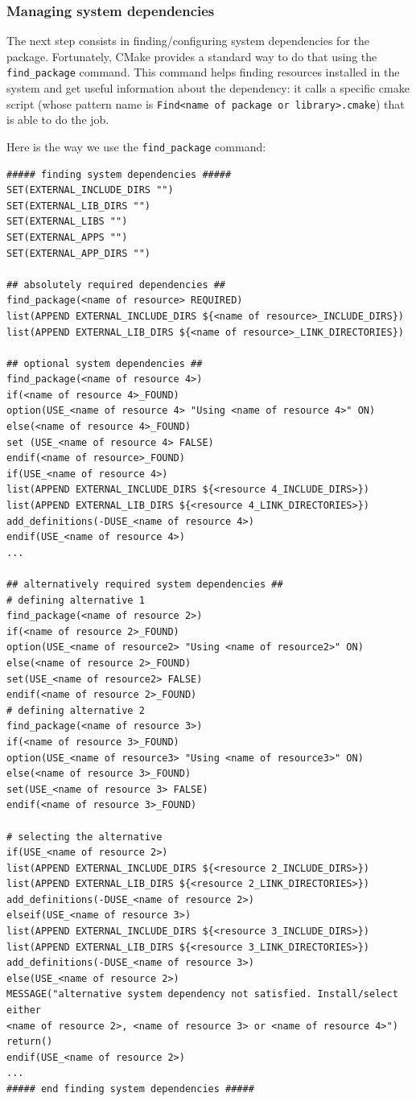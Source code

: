 \documentclass[12pt,a4paper]{article}
\begin{document}
\subsubsection{Managing system dependencies}

The next step consists in finding/configuring system dependencies for the package. Fortunately, CMake provides a standard way to do that using the \verb|find_package| command. This command helps finding resources installed in the system and get useful information about the dependency: it calls a specific cmake script (whose pattern name is \texttt{Find<name of package or library>.cmake}) that is able to do the job.

Here is the way we use the \verb|find_package| command:

\begin{verbatim}
##### finding system dependencies #####
SET(EXTERNAL_INCLUDE_DIRS "")
SET(EXTERNAL_LIB_DIRS "")
SET(EXTERNAL_LIBS "")
SET(EXTERNAL_APPS "")
SET(EXTERNAL_APP_DIRS "")

## absolutely required dependencies ##
find_package(<name of resource> REQUIRED)
list(APPEND EXTERNAL_INCLUDE_DIRS ${<name of resource>_INCLUDE_DIRS})
list(APPEND EXTERNAL_LIB_DIRS ${<name of resource>_LINK_DIRECTORIES})

## optional system dependencies ##
find_package(<name of resource 4>)
if(<name of resource 4>_FOUND)
option(USE_<name of resource 4> "Using <name of resource 4>" ON)
else(<name of resource 4>_FOUND)
set (USE_<name of resource 4> FALSE)
endif(<name of resource>_FOUND)
if(USE_<name of resource 4>)
list(APPEND EXTERNAL_INCLUDE_DIRS ${<resource 4_INCLUDE_DIRS>})
list(APPEND EXTERNAL_LIB_DIRS ${<resource 4_LINK_DIRECTORIES>})
add_definitions(-DUSE_<name of resource 4>)
endif(USE_<name of resource 4>)
...

## alternatively required system dependencies ##
# defining alternative 1
find_package(<name of resource 2>)
if(<name of resource 2>_FOUND)
option(USE_<name of resource2> "Using <name of resource2>" ON)
else(<name of resource 2>_FOUND)
set(USE_<name of resource2> FALSE)
endif(<name of resource 2>_FOUND)
# defining alternative 2
find_package(<name of resource 3>)
if(<name of resource 3>_FOUND)
option(USE_<name of resource3> "Using <name of resource3>" ON)
else(<name of resource 3>_FOUND)
set(USE_<name of resource 3> FALSE)
endif(<name of resource 3>_FOUND)

# selecting the alternative
if(USE_<name of resource 2>)
list(APPEND EXTERNAL_INCLUDE_DIRS ${<resource 2_INCLUDE_DIRS>})
list(APPEND EXTERNAL_LIB_DIRS ${<resource 2_LINK_DIRECTORIES>})
add_definitions(-DUSE_<name of resource 2>)
elseif(USE_<name of resource 3>)
list(APPEND EXTERNAL_INCLUDE_DIRS ${<resource 3_INCLUDE_DIRS>})
list(APPEND EXTERNAL_LIB_DIRS ${<resource 3_LINK_DIRECTORIES>})
add_definitions(-DUSE_<name of resource 3>)
else(USE_<name of resource 2>)
MESSAGE("alternative system dependency not satisfied. Install/select either 
<name of resource 2>, <name of resource 3> or <name of resource 4>")
return()
endif(USE_<name of resource 2>)
...
##### end finding system dependencies #####

\end{verbatim}
\end{document}
